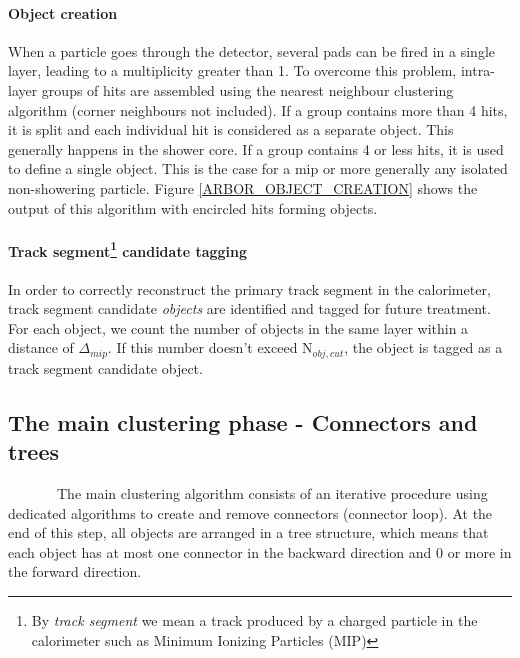\documentclass[cits]{JINST}
\begin{document}
\paragraph*{Object creation} When a particle goes through the detector, several pads can be fired in a single layer, leading to a multiplicity greater than 1. To overcome this problem, intra-layer groups of hits are assembled using the nearest neighbour clustering algorithm (corner neighbours not included). If a group contains more than 4 hits, it is split and each individual hit is considered as a separate object. This generally happens in the shower core. If a group contains 4 or less hits, it is used to define a single object. This is the case for a mip or more generally any isolated non-showering particle. Figure \ref{ARBOR_OBJECT_CREATION} shows the output of this algorithm with encircled hits forming objects.

\paragraph*{Track segment\footnote{By \textit{track segment} we mean a track produced by a charged particle in the calorimeter such as Minimum Ionizing Particles (MIP)} candidate tagging}
In order to correctly reconstruct the primary track segment in the calorimeter, track segment candidate \textit{objects} are identified and tagged for future treatment. For each object, we count the number of objects in the same layer within a distance of $\Delta_{mip}$. If this number doesn't exceed N$_{obj,cut}$, the object is tagged as a track segment candidate object.

\subsection{The main clustering phase - Connectors and trees}

~~~~~~~The main clustering algorithm consists of an iterative procedure using dedicated algorithms to create and remove connectors (connector loop). At the end of this step, all objects are arranged in a tree structure, which means that each object has at most one connector in the backward direction and 0 or more in the forward direction.
\end{document}
